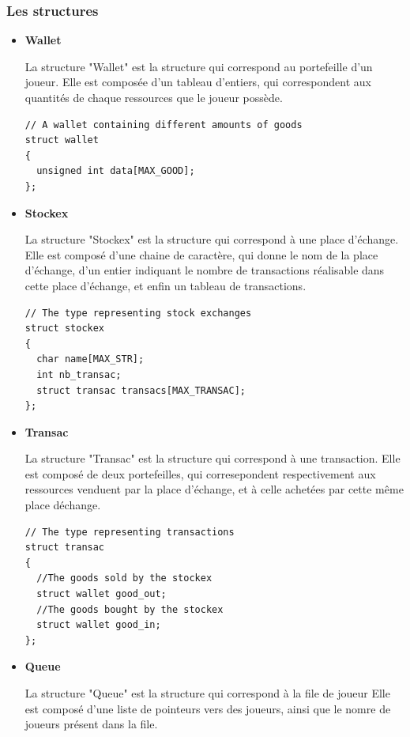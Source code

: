 \documentclass{article}
\begin{document}
\subsubsection{Les structures}

\begin{itemize}

\item\textbf{Wallet}

La structure "Wallet" est la structure qui correspond au portefeille d'un joueur.
Elle est compos\'ee d'un tableau d'entiers, qui correspondent aux quantit\'es de chaque ressources que le joueur poss\`ede.

\begin{lstlisting}
// A wallet containing different amounts of goods
struct wallet 
{
  unsigned int data[MAX_GOOD];
};
\end{lstlisting}

\item\textbf{Stockex}

La structure "Stockex" est la structure qui correspond \`a une place d'\'echange.
Elle est compos\'e d'une chaine de caract\`ere, qui donne le nom de la place d'\'echange, d'un entier indiquant le nombre de transactions r\'ealisable dans cette place d'\'echange,
et enfin un tableau de transactions.

\begin{lstlisting}
// The type representing stock exchanges
struct stockex
{
  char name[MAX_STR];
  int nb_transac;
  struct transac transacs[MAX_TRANSAC];
};
\end{lstlisting}

\item\textbf{Transac}

La structure "Transac" est la structure qui correspond \`a une transaction.
Elle est compos\'e de deux portefeilles, qui corresepondent respectivement aux ressources venduent par la place d'\'echange, et \`a celle achet\'ees par cette m\^eme place d\'echange.

\begin{lstlisting}
// The type representing transactions
struct transac
{
  //The goods sold by the stockex
  struct wallet good_out;
  //The goods bought by the stockex
  struct wallet good_in;
};
\end{lstlisting}

\item\textbf{Queue}

La structure "Queue" est la structure qui correspond \`a la file de joueur
Elle est compos\'e d'une liste de pointeurs vers des joueurs, ainsi que le nomre de joueurs pr\'esent dans la file. 


\end{itemize}
\end{document}
